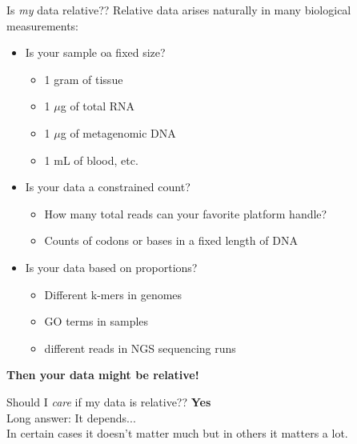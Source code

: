 \documentclass{beamer}\usepackage[]{graphicx}\usepackage[]{color}
\begin{document}
\begin{frame}{Is \emph{my} data relative??}
Relative data arises naturally in many biological measurements:
\begin{itemize}
\item Is your sample oa fixed size?
  \begin{itemize}
  \item 1 gram of tissue
  \item 1 $\mu$g of total RNA
  \item 1 $\mu$g of metagenomic DNA
  \item 1 mL of blood, etc.
  \end{itemize}
\pause
\smallskip
\item Is your data a constrained count?
  \begin{itemize}
  \item How many total reads can your favorite platform handle?
  \item Counts of codons or bases in a fixed length of DNA
  \end{itemize}
\pause
\smallskip
\item Is your data based on proportions?
  \begin{itemize}
  \item Different k-mers in genomes
  \item GO terms in samples
  \item different reads in NGS sequencing runs
  \end{itemize}
\end{itemize}
\pause
\bigskip
\textbf{Then your data might be relative!}
\end{frame}

\begin{frame}{Should I \emph{care} if my data is relative??}
\pause
\textbf{Yes}\\
\bigskip
\pause
Long answer:  It depends...\\
\bigskip
In certain cases it doesn't matter much but in others it matters a lot.
\end{frame}
\end{document}
